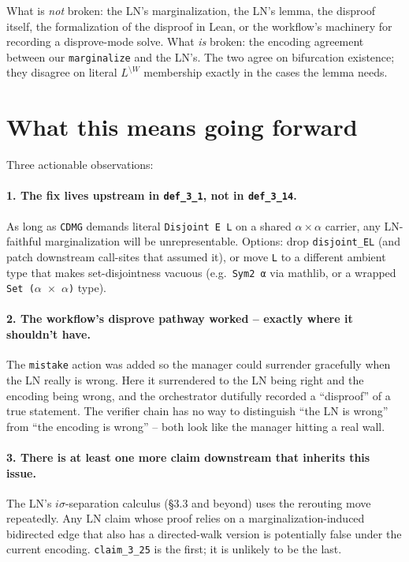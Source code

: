\documentclass[11pt,a4paper]{article}
\providecommand{\sm}{\setminus}
\begin{document}
What is \emph{not} broken: the LN's marginalization, the LN's lemma,
the disproof itself, the formalization of the disproof in Lean, or
the workflow's machinery for recording a disprove-mode solve. What
\emph{is} broken: the encoding agreement between our
\texttt{marginalize} and the LN's. The two agree on bifurcation
existence; they disagree on literal $L^{\sm W}$ membership exactly
in the cases the lemma needs.

\section{What this means going forward}

Three actionable observations:

\paragraph{1. The fix lives upstream in \texttt{def\_3\_1}, not in
\texttt{def\_3\_14}.} As long as \texttt{CDMG} demands literal
\texttt{Disjoint E L} on a shared $\alpha \times \alpha$ carrier,
any LN-faithful marginalization will be unrepresentable. Options:
drop \texttt{disjoint\_EL} (and patch downstream call-sites that
assumed it), or move \texttt{L} to a different ambient type that
makes set-disjointness vacuous (e.g.\ \texttt{Sym2 α} via mathlib,
or a wrapped \texttt{Set ($\alpha$ $\times$ $\alpha$)} type).

\paragraph{2. The workflow's disprove pathway worked --
exactly where it shouldn't have.} The
\texttt{mistake} action was added so the manager could surrender
gracefully when the LN really is wrong. Here it surrendered
to the LN being right and the encoding being wrong, and the
orchestrator dutifully recorded a ``disproof'' of a true statement.
The verifier chain has no way to distinguish ``the LN is wrong''
from ``the encoding is wrong'' -- both look like the manager
hitting a real wall.

\paragraph{3. There is at least one more claim downstream that
inherits this issue.} The LN's $i\sigma$-separation calculus (§3.3
and beyond) uses the rerouting move repeatedly. Any LN claim whose
proof relies on a marginalization-induced bidirected edge that
also has a directed-walk version is potentially false under the
current encoding. \texttt{claim\_3\_25} is the first; it is
unlikely to be the last.
\end{document}
